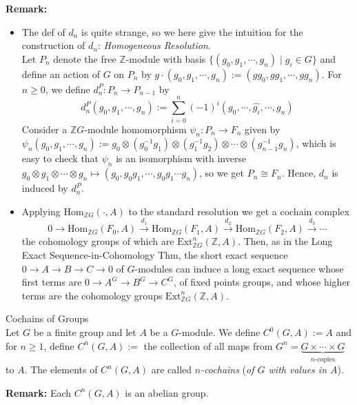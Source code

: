 \noindent\textbf{Remark:}\begin{itemize}
    \item The def of $d_n$ is quite strange, so we here give the intuition for the construction of $d_n$: \textit{Homogeneous Resolution}.\\
    Let $P_n$ denote the free $\mathbb{Z}$-module with basis $\{ (g_0, g_1 ,\cdots, g_n) \mid g_i\in G\}$ and define an action of $G$ on $P_n$ by $g\cdot (g_0 ,g_1 ,\cdots, g_n) := (gg_0 ,gg_1 ,\cdots, gg_n)$. For $n\geq 0$, we define $d_n^P: P_n\to P_{n-1}$ by
    \[
    d_n^P(g_0 ,g_1 ,\cdots, g_n) := \sum_{i=0}^n (-1)^i (g_0 ,\cdots, \hat{g_i} ,\cdots, g_n)
    \]
    Consider a $\mathbb{Z}G$-module homomorphism $\psi_n: P_n\to F_n$ given by $\psi_n(g_0 ,g_1 ,\cdots, g_n) := g_0 \otimes (g_0^{-1}g_1) \otimes (g_1^{-1}g_2) \otimes \cdots \otimes (g_{n-1}^{-1} g_n)$, which is easy to check that $\psi_n$ is an isomorphism with inverse $g_0 \otimes g_1\otimes \cdots \otimes g_n \mapsto (g_0, g_0g_1, \cdots, g_0g_1\cdots g_n)$, so we get $P_n\cong F_n$. Hence, $d_n$ is induced by $d_n^P$.

    \item Applying $\text{Hom}_{\mathbb{Z}G} (\cdot, A)$ to the standard resolution we get a cochain complex
    \[
    0\to \text{Hom}_{\mathbb{Z}G} (F_0,A) \xrightarrow{d_1} \text{Hom}_{\mathbb{Z}G} (F_1,A) \xrightarrow{d_2} \text{Hom}_{\mathbb{Z}G} (F_2,A) \xrightarrow{d_3} \cdots
    \]
    the cohomology groups of which are $\text{Ext}_{\mathbb{Z}G}^n (\mathbb{Z},A)$. Then, as in the Long Exact Sequence-in-Cohomology Thm, the short exact sequence $0\to A\to B\to C\to0$ of $G$-modules can induce a long exact sequence whose first terms are $0\to A^G\to B^G \to C^G$, of fixed points groups, and whose higher terms are the cohomology groups $\text{Ext}_{\mathbb{Z}G}^n (\mathbb{Z},A)$.
\end{itemize}

\begin{definition}{Cochains of Groups}\\
Let $G$ be a finite group and let $A$ be a $G$-module. We define $C^0(G,A) :=A$ and for $n\geq 1$, define $C^n(G,A):=$ the collection of all maps from $G^n= \underbrace{G\times \cdots \times G}_{n\text{-copies}}$ to $A$. The elements of $C^n (G,A)$ are called \textit{$n$-cochains} (\textit{of $G$ with values in $A$}).
\end{definition}

\noindent\textbf{Remark:} Each $C^n (G,A)$ is an abelian group.

